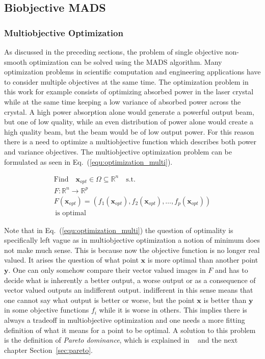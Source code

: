 \documentclass[a4paper,10pt]{article}
\renewcommand{\vec}[1]{\mathbf{#1}}
\newcommand{\equref}[1]{Eq.~(\ref{#1})}
\newcommand{\secref}[1]{Section~\ref{#1}}
\begin{document}
    \subsection{Biobjective MADS}
    \subsubsection{Multiobjective Optimization}

    As discussed in the preceding sections, the problem of single objective
    non-smooth optimization can be solved using the MADS algorithm.
    Many optimization problems in scientific computation and engineering
    applications have to consider multiple objectives at the same time.
    The optimization problem in this work for example consists of
    optimizing absorbed power in the laser crystal while at the same
    time keeping a low variance of absorbed power across the crystal.
    A high power absorption alone would generate a powerful output
    beam, but one of low quality, while an even distribution of power
    alone would create a high quality beam, but the beam would be of low
    output power.
    For this reason there is a need to optimize a multiobjective function
    which describes both power and variance objectives.
    The multiobjective optimization problem can be formulated as seen
    in \equref{equ:optimization_multi}.

    \begin{equation}
        \label{equ:optimization_multi}
        \begin{gathered}
        \text{Find} \quad \vec{x}_{opt} \in \Omega \subseteq \mathbb{R}^n \quad \text{s.t.}\\
        F:\mathbb{R}^n \rightarrow \mathbb{R}^p \\ 
        F(\vec{x}_{opt}) = (f_1(\vec{x}_{opt}),f_2(\vec{x}_{opt}),\dots,f_p(\vec{x}_{opt}))\\
        \, \text{is optimal}
        \end{gathered}
    \end{equation}

    Note that in \equref{equ:optimization_multi} the question of optimality is
    specifically left vague as in multiobjective optimization a notion
    of minimum does not make much sense.
    This is because now the objective function is no longer real valued.
    It arises the question of what point $\vec{x}$ is more optimal than
    another point $\vec{y}$.
    One can only somehow compare their vector valued images in $F$ and
    has to decide what is inherently a better output, a worse output or
    as a consequence of vector valued outputs an indifferent output.
    indifferent in this sense means that one cannot say what output
    is better or worse, but the point $\vec{x}$ is better than $\vec{y}$
    in some objective functions $f_i$ while it is worse in others.
    This implies there is always a tradeoff in multiobjective optimization
    and one needs a more fitting definition of what it means
    for a point to be optimal.
    A solution to this problem is the definition of \emph{Pareto dominance},
    which is explained in ~\cite{multiobjective} and the next chapter 
    \secref{sec:pareto}.
\end{document}
